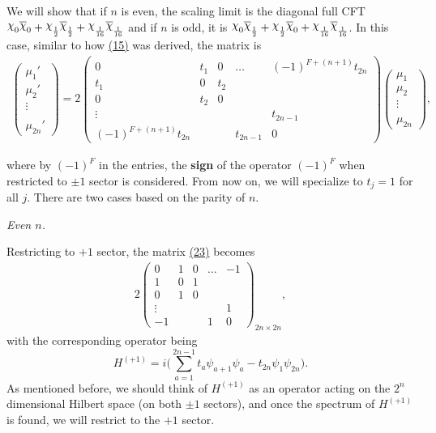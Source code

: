 \documentclass[twoside,11pt,titlepage]{amsart}
\renewcommand{\=}[1]{\stackrel{#1}{=}} %
\theoremstyle{definition}
\theoremstyle{remark}
\DeclareRobustCommand{\rchi}{{\mathpalette\irchi\relax}}
\newcommand{\irchi}[2]{\raisebox{\depth}{$#1\chi$}}
\begin{document}
We will show that if $n$ is even, the scaling limit is the diagonal full CFT $\rchi_0\overline{\rchi}_0+\rchi_{\frac{1}{2}}\overline{\rchi}_{\frac{1}{2}}+\rchi_{\frac{1}{16}}\overline{\rchi}_{\frac{1}{16}}$ and if $n$ is odd, it is $\rchi_0\overline{\rchi}_{\frac{1}{2}}+\rchi_{\frac{1}{2}}\overline{\rchi}_0+\rchi_{\frac{1}{16}}\overline{\rchi}_{\frac{1}{16}}$. In this case, similar to how \hyperref[eq15]{(15)} was derived, the matrix is
\begin{align}\label{eq23}
   \begin{pmatrix}
           \mu_1' \\
           \mu_{2}' \\
           \vdots \\
            \\
           \mu_{2n}'
         \end{pmatrix}
         = 2\begin{pmatrix}
         0 & t_1 & 0 & \ldots & (-1)^{F+(n+1)}t_{2n} \\
         t_1 & 0 & t_2 & &  \\
         0 & t_2 & 0 & &   \\
         \vdots &  &  &  & t_{2n-1} \\
         (-1)^{F+(n+1)}t_{2n} &  & & t_{2n-1} & 0 
         \end{pmatrix}
         \begin{pmatrix}
         \mu_1 \\
         \mu_{2} \\
         \vdots \\
            \\
         \mu_{2n}
         \end{pmatrix},
\end{align}

where by $(-1)^F$ in the entries, the \textbf{sign} of the operator $(-1)^F$ when restricted to $\pm 1$ sector is considered. From now on, we will specialize to $t_j=1$ for all $j$. There are two cases based on the parity of $n$.
\hfill \break

\textit{Even $n$.}

Restricting to $+1$ sector, the matrix \hyperref[eq23]{(23)} becomes
\begin{align}\label{eq24}
2\begin{pmatrix}
         0 & 1 & 0 & \ldots & -1 \\
         1 & 0 & 1 & &  \\
         0 & 1 & 0 & &   \\
         \vdots &  &  &  & 1 \\
          -1 &  & & 1 & 0 
\end{pmatrix}_{2n\times 2n},
\end{align}
with the corresponding operator being
$$H^{(+1)}=i \Big(\sum_{a=1}^{2n-1} t_a \psi_{a+1}\psi_a - t_{2n}\psi_1\psi_{2n}\Big).$$
As mentioned before, we should think of $H^{(+1)}$ as an operator acting on the $2^n$ dimensional Hilbert space (on both $\pm 1$ sectors), and once the spectrum of $H^{(+1)}$ is found, we will restrict to the $+1$ sector.
\end{document}
